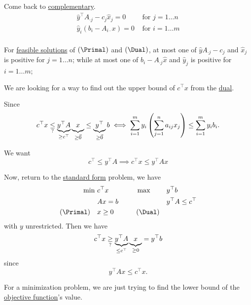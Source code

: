 Come back to \hyperref[def:complementary]{complementary}.
\[
	\begin{split}
		\hat{y}^{\top} A_{\cdot j} - c_{j}\hat{x}_j = 0 & \text{ for }j = 1\dots n \\
		\hat{y}_i(b_{i} - A_{i\cdot }x) = 0             & \text{ for }i = 1\dots m \\
	\end{split}
\]

\begin{note}
	For \hyperref[def:feasible-solution]{feasible solutions} of \((\Primal)\) and \((\Dual)\), at most one of \(\hat{y}A_{\cdot j} - c_{j}\) and \(\hat{x}_j\) is positive for \(j = 1\dots n\);
	while at most one of \(b_{i} - A_{\cdot j}\hat{x}\) and \(\hat{y}_j\) is positive for \(i = 1\dots m\);
\end{note}

\begin{problem}
We are looking for a way to find out the upper bound of \(c^{\top}x\) from the \hyperref[def:dual]{dual}.
\end{problem}
\begin{answer}
	Since
	\[
		c^{\top}x \underset{?}{\leq}
		\underbrace{y^{\top} A }_{\geq c^{\top}}\underbrace{\vphantom{y^{\top}A}x}_{\geq \vec{0}}
		\leq \underbrace{y^{\top}}_{\geq \vec{0}} b
		\iff \sum\limits_{i=1}^{m} y_{i} \left( \sum\limits_{j=1}^{n} a_{ij}x_{j} \right)
		\leq \sum\limits_{i=1}^{m} y_{i}b_{i}.
	\]

	We want
	\[
		c^{\top}\leq y^{\top}A\implies c^{\top}x\leq y^{\top} Ax
	\]

	Now, return to the \hyperref[def:standard-form]{standard form} problem, we have
	\[
		\begin{alignedat}{5}
			\min~          & c^{\top}x\qquad\qquad &  & \max ~       &  & y^{\top}b              \\
			               & Ax = b                &  &              &  & y^{\top}A\leq c^{\top} \\
			(\Primal)\quad & x\geq  0              &  & (\Dual)\quad &  &
		\end{alignedat}
	\]
	with \(y\) unrestricted. Then we have
	\[
		c^{\top}x\underset{?}{\geq} \underbrace{y^{\top}A}_{\leq c^{\top}}\underbrace{\vphantom{y^{\top}A}x}_{\geq 0} = y^{\top} b
	\]
	since \[
		y^{\top}Ax\leq c^{\top}x.
	\]
\end{answer}

\begin{intuition}
	For a minimization problem, we are just trying to find the lower bound of the \hyperref[def:objective-function]{objective function}'s value.
\end{intuition}

